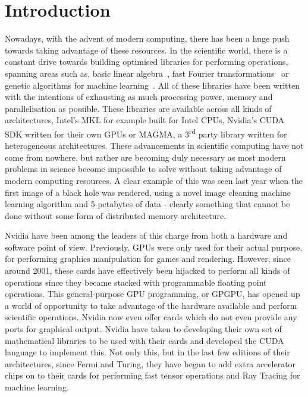 \clearpage
\chapter{Introduction}

Nowadays, with the advent of modern computing, there has been a huge push towards taking advantage of these resources. In the scientific world, there is a constant drive towards building optimised libraries for performing operations, spanning areas such as, basic linear algebra~\cite{blas}, fast Fourier transformations~\cite{fftw} or genetic algorithms for machine learning~\cite{galib}. All of these libraries have been written with the intentions of exhausting as much processing power, memory and parallelisation as possible. These libraries are available across all kinds of architectures, Intel's MKL for example built for Intel CPUs, Nvidia's CUDA SDK written for their own GPUs or MAGMA, a 3\textsuperscript{rd} party library written for heterogeneous architectures. These advancements in scientific computing have not come from nowhere, but rather are becoming duly necessary as most modern problems in science become impossible to solve without taking advantage of modern computing resources. A clear example of this was seen last year when the first image of a black hole was rendered, using a novel image cleaning machine learning algorithm and 5 petabytes of data - clearly something that cannot be done without some form of distributed memory architecture.

Nvidia have been among the leaders of this charge from both a hardware and software point of view. Previously, GPUs were only used for their actual purpose, for performing graphics manipulation for games and rendering. However, since around 2001, these cards have effectively been hijacked to perform all kinds of operations since they became stacked with programmable floating point operations. This general-purpose GPU programming, or GPGPU, has opened up a world of opportunity to take advantage of the hardware available and perform scientific operations. Nvidia now even offer cards which do not even provide any ports for graphical output. Nvidia have taken to developing their own set of mathematical libraries to be used with their cards and developed the CUDA language to implement this. Not only this, but in the last few editions of their architectures, since Fermi and Turing, they have began to add extra accelerator chips on to their cards for performing fast tensor  operations and Ray Tracing for machine learning.

